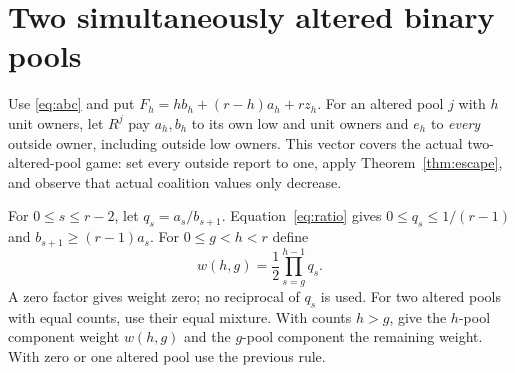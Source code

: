 \documentclass[11pt]{article}
\theoremstyle{definition}\newtheorem{definition}[theorem]{Definition}
\theoremstyle{remark}\newtheorem{remark}[theorem]{Remark}
\begin{document}
\appendix
\section{Two simultaneously altered binary pools}\label{app:binary}
Use \eqref{eq:abc} and put $F_h=h b_h+(r-h)a_h+rz_h$. For an altered pool
$j$ with $h$ unit owners, let $R^j$ pay $a_h,b_h$ to its own low and unit
owners and $e_h$ to \emph{every} outside owner, including outside low owners.
This vector covers the actual two-altered-pool game: set every outside report
to one, apply Theorem~\ref{thm:escape}, and observe that actual coalition
values only decrease.

For $0\le s\le r-2$, let $q_s=a_s/b_{s+1}$. Equation~\eqref{eq:ratio}
gives $0\le q_s\le1/(r-1)$ and $b_{s+1}\ge(r-1)a_s$.
For $0\le g<h<r$ define
\[
 w(h,g)=\frac12\prod_{s=g}^{h-1}q_s.
\]
A zero factor gives weight zero; no reciprocal of $q_s$ is used.
For two altered pools with equal counts, use their equal mixture. With counts
$h>g$, give the $h$-pool component weight $w(h,g)$ and the $g$-pool component
the remaining weight. With zero or one altered pool use the previous rule.
\end{document}
